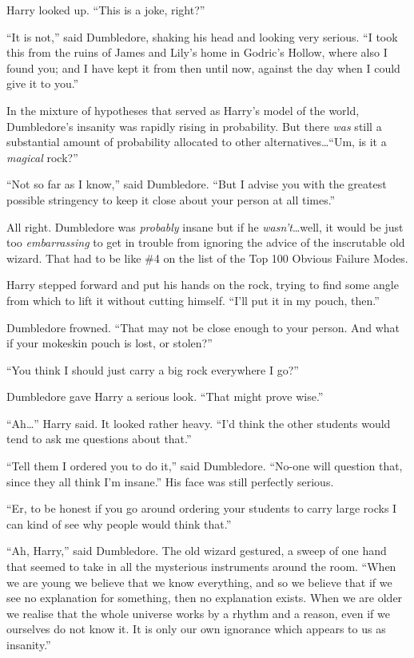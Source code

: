 Harry looked up. “This is a joke, right?”

“It is not,” said Dumbledore, shaking his head and looking very serious. “I took this from the ruins of James and Lily’s home in Godric’s Hollow, where also I found you; and I have kept it from then until now, against the day when I could give it to you.”

In the mixture of hypotheses that served as Harry’s model of the world, Dumbledore’s insanity was rapidly rising in probability. But there \emph{was} still a substantial amount of probability allocated to other alternatives…“Um, is it a \emph{magical} rock?”

“Not so far as I know,” said Dumbledore. “But I advise you with the greatest possible stringency to keep it close about your person at all times.”

All right. Dumbledore was \emph{probably} insane but if he
\emph{wasn’t}…well, it would be just too \emph{embarrassing} to get in trouble from ignoring the advice of the inscrutable old wizard. That had to be like \#4 on the list of the Top 100 Obvious Failure Modes.

Harry stepped forward and put his hands on the rock, trying to find some angle from which to lift it without cutting himself. “I’ll put it in my pouch, then.”

Dumbledore frowned. “That may not be close enough to your person. And what if your mokeskin pouch is lost, or stolen?”

“You think I should just carry a big rock everywhere I go?”

Dumbledore gave Harry a serious look. “That might prove wise.”

“Ah…” Harry said. It looked rather heavy. “I’d think the other students would tend to ask me questions about that.”

“Tell them I ordered you to do it,” said Dumbledore. “No-one will question that, since they all think I’m insane.” His face was still perfectly serious.

“Er, to be honest if you go around ordering your students to carry large rocks I can kind of see why people would think that.”

“Ah, Harry,” said Dumbledore. The old wizard gestured, a sweep of one hand that seemed to take in all the mysterious instruments around the room. “When we are young we believe that we know everything, and so we believe that if we see no explanation for something, then no explanation exists. When we are older we realise that the whole universe works by a rhythm and a reason, even if we ourselves do not know it. It is only our own ignorance which appears to us as insanity.”

